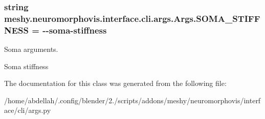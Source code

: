 \subsubsection[{\texorpdfstring{S\+O\+M\+A\+\_\+\+S\+T\+I\+F\+F\+N\+E\+SS}{SOMA_STIFFNESS}}]{\setlength{\rightskip}{0pt plus 5cm}string meshy.\+neuromorphovis.\+interface.\+cli.\+args.\+Args.\+S\+O\+M\+A\+\_\+\+S\+T\+I\+F\+F\+N\+E\+SS = \textquotesingle{}-\/-\/soma-\/stiffness\textquotesingle{}\hspace{0.3cm}{\ttfamily [static]}}\hypertarget{classmeshy_1_1neuromorphovis_1_1interface_1_1cli_1_1args_1_1Args_a324ec9c253af1991226b57b7fc508dfb}{}\label{classmeshy_1_1neuromorphovis_1_1interface_1_1cli_1_1args_1_1Args_a324ec9c253af1991226b57b7fc508dfb}


Soma arguments. 

Soma stiffness 

The documentation for this class was generated from the following file\+:\begin{DoxyCompactItemize}
\item 
/home/abdellah/.\+config/blender/2./scripts/addons/meshy/neuromorphovis/interface/cli/args.\+py\end{DoxyCompactItemize}
